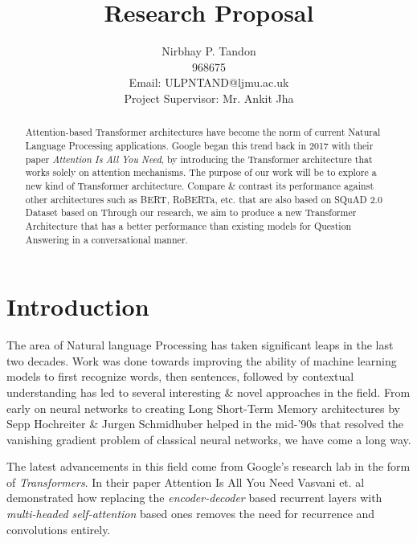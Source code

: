 \documentclass[11pt]{article}
\begin{document}
\title{Research Proposal}

\author{Nirbhay P. Tandon\\968675\\Email: ULPNTAND@ljmu.ac.uk\\
Project Supervisor: Mr. Ankit Jha
}
\date{}
\maketitle


\begin{abstract}
Attention-based Transformer architectures have become the norm of current Natural Language Processing applications. Google began this trend back in 2017 with their paper \textit{Attention Is All You Need}\cite{atayl}, by introducing the Transformer architecture that works solely on attention mechanisms. The purpose of our work will be to explore a new kind of Transformer architecture. Compare \& contrast its performance against other architectures such as BERT\cite{bert}, RoBERTa\cite{roberta}, etc. that are also based on SQuAD 2.0 Dataset\cite{dataset} based on  Through our research, we aim to produce a new Transformer Architecture that has a better performance than existing models for Question Answering in a conversational manner.
\end{abstract}
\newpage
\tableofcontents
\newpage
\section{Introduction}\label{introduction}

The area of Natural language Processing has taken significant leaps in the last two decades. Work was done towards improving the ability of machine learning models to first recognize words, then sentences, followed by contextual understanding has led to several interesting \& novel approaches in the field. From early on neural networks to creating Long Short-Term Memory architectures\cite{originallstm} by Sepp Hochreiter \& Jurgen Schmidhuber helped in the mid-'90s that resolved the vanishing gradient problem of classical neural networks, we have come a long way.

The latest advancements in this field come from Google's research lab in the form of \textit{Transformers}\cite{atayl}. In their paper Attention Is All You Need\cite{atayl} Vasvani et. al demonstrated how replacing the \textit{encoder-decoder} based recurrent layers with \textit{multi-headed self-attention} based ones removes the need for recurrence and convolutions entirely.
\end{document}
